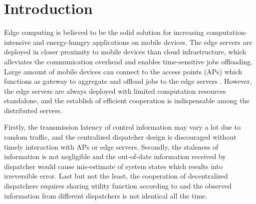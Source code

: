 
\section{Introduction}
Edge computing is believed to be the solid solution for increasing computation-intensive and energy-hungry applications on mobile devices.
The edge servers are deployed in closer proximity to mobile devices than cloud infrastructure, which alleviates the communication overhead and enables {time-sensitive} jobs offloading.
Large amount of mobile devices can connect to the access points (APs) which functions as gateway to aggregate and offload jobs to the edge servers \cite{MEC-SURVEY}.
However, the edge servers are always deployed with limited computation resources standalone, and the establish of efficient cooperation is indispensable among the distributed servers.

Firstly, the transmission latency of control information may vary a lot due to random traffic, and the centralized dispatcher design is discouraged without timely interaction with APs or edge servers.
Secondly, the staleness of information is not negligible and the out-of-date information received by dispatcher would cause mis-estimate of system states which results into irreversible error.
Last but not the least, the cooperation of decentralized dispatchers requires sharing utility function according to \cite{IJCAI03-NairR} and the observed information from different dispatchers is not identical all the time.

